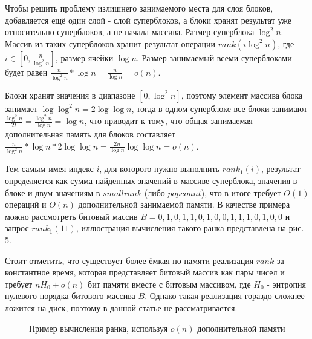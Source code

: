 \documentclass[a4paper,12pt]{article}
\begin{document}
Чтобы решить проблему излишнего занимаемого места для слоя блоков, добавляется ещё один слой - слой суперблоков, а блоки хранят результат уже относительно суперблоков, а не начала массива. Размер суперблока $\log^2 n$. Массив из таких суперблоков хранит результат операции $rank(i \log^2 n)$, где $i \in [0, \frac{n}{\log^2 n}]$, размер ячейки $\log{n}$. Размер занимаемый всеми суперблоками будет равен $\frac{n}{\log^2 n}*\log n = \frac{n}{\log{n}} = o(n)$.

Блоки хранят значения в диапазоне $[0, \log^2{n}]$, поэтому элемент массива блока занимает $\log{\log^2{n}} = 2 \log \log n$, тогда в одном суперблоке все блоки занимают $\frac{\log^2{n}}{2t} = \frac{\log^2{n}}{\log{n}} = \log{n}$, что приводит к тому, что общая занимаемая дополнительная память для блоков составляет $\frac{n}{\log^2{n}} * \log{n} * 2 \log \log n = \frac{2n}{\log n} \log \log n = o(n)$.

Тем самым имея индекс $i$, для которого нужно выполнить $rank_1(i)$, результат определяется как сумма найденных значений в массиве суперблока, значения в блоке и двум значениям в $smallrank$ (либо $popcount$), что в итоге требует $O(1)$ операций и $O(n)$ дополнительной занимаемой памяти.
В качестве примера можно рассмотреть битовый массив $B={0, 1, 0, 1, 1, 0, 1, 0, 0, 1, 1, 1, 0, 1, 0, 0}$ и запрос $rank_1(11)$, иллюстрация вычисления такого ранка представлена на рис. 5.

Стоит отметить, что существует более ёмкая по памяти реализация $rank$ за константное время, которая представляет битовый массив как пары чисел и требует $nH_0 + o(n)$ бит памяти вместе с битовым массивом, где $H_0$ - энтропия нулевого порядка битового массива $B$. Однако такая реализация гораздо сложнее ложится на диск, поэтому в данной статье не рассматривается.

\begin{figure}[h!]
\caption{Пример вычисления ранка, используя $o(n)$ дополнительной памяти}
\end{figure}
\noindent
\newpage
\end{document}
